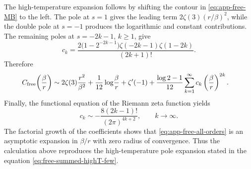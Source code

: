 \documentclass[a4paper,11pt]{article}
\newcommand{\e}{\mathrm e}
\newcommand{\dd}{\mathrm d}
\begin{document}
The high-temperature expansion follows by shifting the contour in
\eqref{eq:app-free-MB} to the left.  The pole at $s=1$ gives the leading
term $2\zeta(3)(r/\beta)^2$, while the double pole at $s=-1$ produces
the logarithmic and constant contributions.  The remaining poles at
$s=-2k-1$, $k\geq1$, give
\begin{equation}
	c_k
	=
	\frac{
		2\bigl(1-2^{-2k-1}\bigr)
		\zeta(-2k-1)\zeta(1-2k)}
	{(2k+1)!}.
	\label{eq:app-free-ck}
\end{equation}
Therefore
\begin{align}
	C_{\rm free}\!\left(\frac{\beta}{r}\right)
	\sim{}&
	2\zeta(3)\frac{r^2}{\beta^2}
	+\frac{1}{12}\log\!\frac{\beta}{r}
	+\zeta'(-1)
	+\frac{\log2-1}{12}
	\sum_{k=1}^{\infty}
	c_k\left(\frac{\beta}{r}\right)^{2k}.
	\label{eq:app-free-all-orders}
\end{align}
Finally, the functional equation of the Riemann zeta function yields
\begin{equation}
	c_k
	\sim
	-\frac{8(2k-1)!}{(2\pi)^{4k+2}},
	\qquad k\to\infty.
	\label{eq:app-free-large-order}
\end{equation}
The factorial growth of the coefficients shows that
\eqref{eq:app-free-all-orders} is an asymptotic expansion in
$\beta/r$ with zero radius of convergence.
Thus the calculation above reproduces the high-temperature
pole expansion stated in the equation
\eqref{eq:free-summed-highT-few}.
%
\end{document}
